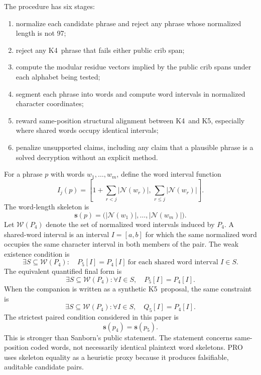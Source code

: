 \documentclass[12pt]{paperFormatting}
\newcommand{\Kfour}{K4}
\newcommand{\Kfive}{K5}
\newcommand{\Norm}{\mathcal{N}}
\newcommand{\WordSet}{\mathcal{W}}
\begin{document}
\begin{thesisbody}
The procedure has six stages:
\begin{enumerate}
    \item normalize each candidate phrase and reject any phrase whose normalized length is not 97;
    \item reject any \Kfour\ phrase that fails either public crib span;
    \item compute the modular residue vectors implied by the public crib spans under each alphabet being tested;
    \item segment each phrase into words and compute word intervals in normalized character coordinates;
    \item reward same-position structural alignment between \Kfour\ and \Kfive, especially where shared words occupy identical intervals;
    \item penalize unsupported claims, including any claim that a plausible phrase is a solved decryption without an explicit method.
\end{enumerate}

For a phrase $p$ with words $w_1,\ldots,w_m$, define the word interval function
\begin{equation}
    I_j(p) =
    \left[
    1 + \sum_{r<j} |\Norm(w_r)|,\,
    \sum_{r\leq j} |\Norm(w_r)|
    \right].
\end{equation}
The word-length skeleton is
\begin{equation}
    \mathbf{s}(p) =
    \bigl(|\Norm(w_1)|,\ldots,|\Norm(w_m)|\bigr).
\end{equation}
Let $\WordSet(P_4)$ denote the set of normalized word intervals induced by $P_4$. A shared-word interval is an interval $I=[a,b]$ for which the same normalized word occupies the same character interval in both members of the pair. The weak existence condition is
\begin{equation}
    \exists S \subseteq \WordSet(P_4):
    \quad
    P_5[I] = P_4[I]\ \text{for each shared word interval } I \in S.
\end{equation}
The equivalent quantified final form is
\begin{equation}
    \exists S \subseteq \WordSet(P_4): \forall I \in S,\quad P_5[I] = P_4[I].
\end{equation}
When the companion is written as a synthetic \Kfive\ proposal, the same constraint is
\begin{equation}
    \exists S \subseteq \WordSet(P_4): \forall I \in S,\quad Q_5[I] = P_4[I].
\end{equation}
The strictest paired condition considered in this paper is
\begin{equation}
    \mathbf{s}(p_4)=\mathbf{s}(p_5).
\end{equation}
This is stronger than Sanborn's public statement. The statement concerns same-position coded words, not necessarily identical plaintext word skeletons. PRO uses skeleton equality as a heuristic proxy because it produces falsifiable, auditable candidate pairs.


\end{thesisbody}
\end{document}
